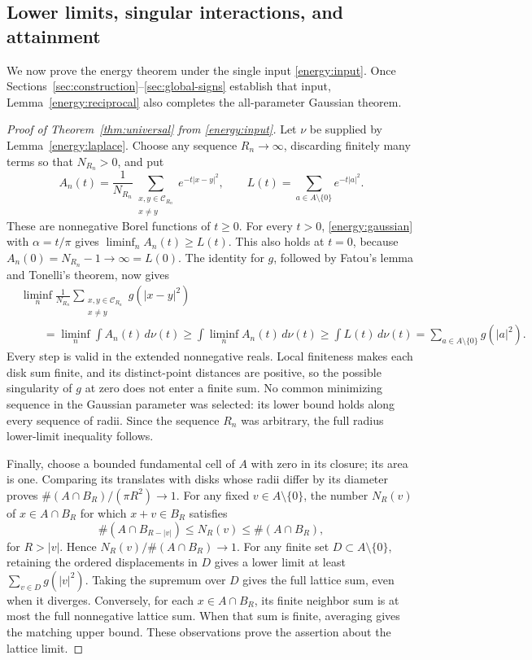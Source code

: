\documentclass[11pt]{article}
\theoremstyle{remark}\newtheorem{remark}[theorem]{Remark}
\begin{document}
\subsection{Lower limits, singular interactions, and attainment}

We now prove the energy theorem under the single input
\eqref{energy:input}. Once Sections~\ref{sec:construction}--\ref{sec:global-signs}
establish that input, Lemma~\ref{energy:reciprocal} also completes the
all-parameter Gaussian theorem.

\begin{proof}[Proof of Theorem~\ref{thm:universal} from \eqref{energy:input}]

Let $\nu$ be supplied by Lemma~\ref{energy:laplace}.
Choose any sequence $R_n\to\infty$, discarding finitely many terms
so that $N_{R_n}>0$, and put
\[
 A_n(t)=\frac1{N_{R_n}}
 \sum_{\substack{x,y\in\mathcal C_{R_n}\\x\ne y}}
 e^{-t|x-y|^2},\qquad
 L(t)=\sum_{a\in A\setminus\{0\}}e^{-t|a|^2}.
\]
These are nonnegative Borel functions of $t\ge0$.
For every $t>0$, \eqref{energy:gaussian} with $\alpha=t/\pi$ gives
$\liminf_n A_n(t)\ge L(t)$.
This also holds at $t=0$, because
$A_n(0)=N_{R_n}-1\to\infty=L(0)$.
The identity for $g$, followed by Fatou's lemma and Tonelli's theorem,
now gives
\begin{align*}
 &\liminf_n\frac1{N_{R_n}}
 \sum_{\substack{x,y\in\mathcal C_{R_n}\\x\ne y}}g(|x-y|^2)\\
 &\qquad=\liminf_n\int A_n(t)\,d\nu(t)
 \ge\int\liminf_n A_n(t)\,d\nu(t)
 \ge\int L(t)\,d\nu(t)
 =\sum_{a\in A\setminus\{0\}}g(|a|^2).
\end{align*}
Every step is valid in the extended nonnegative reals.
Local finiteness makes each disk sum finite, and its distinct-point
distances are positive, so the possible singularity of $g$ at zero
does not enter a finite sum. No common minimizing sequence in the
Gaussian parameter was selected: its lower bound holds along every
sequence of radii. Since the sequence $R_n$ was arbitrary, the full
radius lower-limit inequality follows.

Finally, choose a bounded fundamental cell of $A$ with zero in its
closure; its area is one. Comparing its translates with disks whose
radii differ by its diameter proves
$\#(A\cap B_R)/(\pi R^2)\to1$.
For any fixed $v\in A\setminus\{0\}$, the number $N_R(v)$ of
$x\in A\cap B_R$ for which $x+v\in B_R$ satisfies
\[
 \#(A\cap B_{R-|v|})\le N_R(v)\le\#(A\cap B_R),
\]
for $R>|v|$. Hence $N_R(v)/\#(A\cap B_R)\to1$.
For any finite set $D\subset A\setminus\{0\}$, retaining the
ordered displacements in $D$ gives a lower limit at least
$\sum_{v\in D}g(|v|^2)$. Taking the supremum over $D$ gives the
full lattice sum, even when it diverges.
Conversely, for each $x\in A\cap B_R$, its finite neighbor sum is
at most the full nonnegative lattice sum. When that sum is finite,
averaging gives the matching upper bound. These observations prove
the assertion about the lattice limit.
\end{proof}
\end{document}
